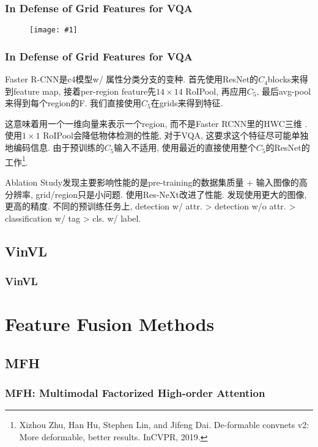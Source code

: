 \documentclass{beamer}
\newcommand{\cfig}[2]{
    \begin{figure}[htbp]
    \centering
    \texttt{[image: \#1]}
\end{figure}
}
\begin{document}
\begin{frame}
    \frametitle{In Defense of Grid Features for VQA}

    \cfig{gridfeat-comp.png}{1.0}

\end{frame}

\begin{frame}
    \frametitle{In Defense of Grid Features for VQA}

    Faster R-CNN是c4模型w/ 属性分类分支的变种. 首先使用ResNet的$C_4$blocks来得到feature map, 接着per-region feature先$14\times 14$ RoIPool, 再应用$C_5$, 最后avg-pool来得到每个region的F. 我们直接使用$C_5$在grids来得到特征.

    这意味着用一个一维向量来表示一个region, 而不是Faster RCNN里的HWC三维 .使用$1\times 1$ RoIPool会降低物体检测的性能, 对于VQA, 这要求这个特征尽可能单独地编码信息. 由于预训练的$C_5$输入不适用, 使用最近的直接使用整个$C_5$的ResNet的工作\footnote{
        Xizhou Zhu, Han Hu, Stephen Lin, and Jifeng Dai.  De-formable convnets v2: More deformable, better results. InCVPR, 2019.
    }.

    Ablation Study发现主要影响性能的是pre-training的数据集质量 + 输入图像的高分辨率, grid/region只是小问题. 使用Res-NeXt改进了性能. 发现使用更大的图像, 更高的精度. 不同的预训练任务上, detection w/ attr. > detection w/o attr. > classification w/ tag > cls. w/ label.

\end{frame}

\subsection{VinVL}

\begin{frame}
    \frametitle{VinVL}

    

\end{frame}

\section{Feature Fusion Methods}

\subsection{MFH}

\begin{frame}
    \frametitle{MFH: Multimodal Factorized High-order Attention}

    

\end{frame}
\end{document}
